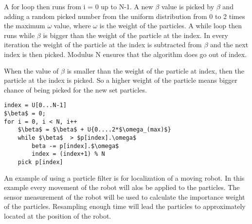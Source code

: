 A for loop then runs from i = 0 up to N-1. A new $\beta$ value is picked by $\beta$ and adding a random picked number from the uniform distribution from 0 to 2 times the maximum $\omega$ value, where $\omega$ is the weight of the particles. A while loop then runs while $\beta$ is bigger than the weight of the particle at the index. In every iteration the weight of the particle at the index is subtracted from $\beta$ and the next index is then picked. Modulus N ensures that the algorithm does go out of index. 

When the value of $\beta$ is smaller than the weight of the particle at index, then the particle at the index is picked. So a higher weight of the particle means bigger chance of being picked for the new set particles. 

\begin{lstlisting}[caption={Pesudo code for the resampling wheel}, label=lst:wheel, mathescape=true]
index = U[0...N-1]
$\beta$ = 0;
for i = 0, i < N, i++
	$\beta$ = $\beta$ + U{0....2*$\omega_(max)$}
	while $\beta$  > $p[index].\omega$ 
		beta -= p[index].$\omega$
		index = (index+1) % N
	pick p[index]
\end{lstlisting}

An example of using a particle filter is for localization of a moving robot. In this example every movement of the robot will alos be applied to the particles. The sensor measurement of the robot will be used to calculate the importance weight of the particles. Resampling enough time will lead the particles to approximately located at the position of the robot.


